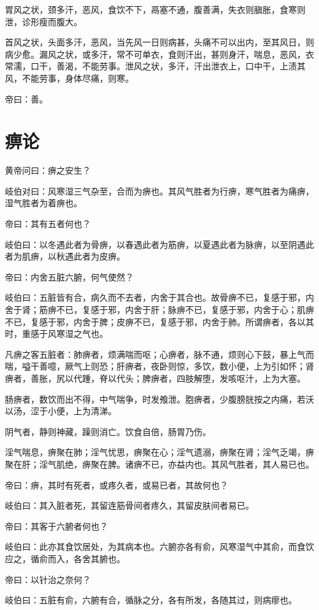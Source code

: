 \documentclass{article}%
\begin{document}
胃风之状，颈多汗，恶风，食饮不下，鬲塞不通，腹善满，失衣则䐜胀，食寒则泄，诊形瘦而腹大。

首风之状，头面多汗，恶风，当先风一日则病甚，头痛不可以出内，至其风日，则病少愈。漏风之状，或多汗，常不可单衣，食则汗出，甚则身汗，喘息，恶风，衣常濡，口干，善渴，不能劳事。泄风之状，多汗，汗出泄衣上，口中干，上渍其风，不能劳事，身体尽痛，则寒。

帝曰：善。
\section{痹论}
黄帝问曰：痹之安生？

岐伯对曰：风寒湿三气杂至，合而为痹也。其风气胜者为行痹，寒气胜者为痛痹，湿气胜者为着痹也。

帝曰：其有五者何也？

岐伯曰：以冬遇此者为骨痹，以春遇此者为筋痹，以夏遇此者为脉痹，以至阴遇此者为肌痹，以秋遇此者为皮痹。

帝曰：内舍五脏六腑，何气使然？

岐伯曰：五脏皆有合，病久而不去者，内舍于其合也。故骨痹不已，复感于邪，内舍于肾；筋痹不已，复感于邪，内舍于肝；脉痹不已，复感于邪，内舍于心；肌痹不已，复感于邪，内舍于脾；皮痹不已，复感于邪，内舍于肺。所谓痹者，各以其时，重感于风寒湿之气也。

凡痹之客五脏者：肺痹者，烦满喘而呕；心痹者，脉不通，烦则心下鼓，暴上气而喘，嗌干善噫，厥气上则恐；肝痹者，夜卧则惊，多饮，数小便，上为引如怀；肾痹者，善胀，尻以代踵，脊以代头；脾痹者，四肢解堕，发咳呕汁，上为大塞。

肠痹者，数饮而出不得，中气喘争，时发飧泄。胞痹者，少腹膀胱按之内痛，若沃以汤，涩于小便，上为清涕。

阴气者，静则神藏，躁则消亡。饮食自倍，肠胃乃伤。

淫气喘息，痹聚在肺；淫气忧思，痹聚在心；淫气遗溺，痹聚在肾；淫气乏竭，痹聚在肝；淫气肌绝，痹聚在脾。诸痹不已，亦益内也。其风气胜者，其人易已也。

帝曰：痹，其时有死者，或疼久者，或易已者，其故何也？

岐伯曰：其入脏者死，其留连筋骨间者疼久，其留皮肤间者易已。

帝曰：其客于六腑者何也？

岐伯曰：此亦其食饮居处，为其病本也。六腑亦各有俞，风寒湿气中其俞，而食饮应之，循俞而入，各舍其腑也。

帝曰：以针治之奈何？

岐伯曰：五脏有俞，六腑有合，循脉之分，各有所发，各随其过，则病瘳也。
\end{document}
